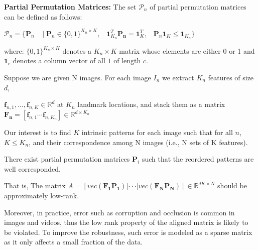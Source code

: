 \documentclass[fleqn, 11pt]{article}
\newcommand{\bs}[1]{\boldsymbol{#1}}
\begin{document}
\textbf{Partial Permutation Matrices: } The set $\mathcal{P}_n$ of partial permutation matrices can be defined as follows:

\begin{center}
    $\mathcal{P}_n  = \{ \bs{P}_n \;\;\; \mid \bs{P}_n \in \{0,1\}^{K_n \times K}, 
    \;\;\; \bs{1}^T_{K_n}\bs{P_n} =   \bs{1}^T_{K}, \;\;\;     \bs{P}_n \bs{1}_K \leq  \bs{1}_{K_n}   \} $
\end{center}
where: $ \{0,1\}^{K_n \times K}$ denotes a $K_n \times K$ matrix whose elements are either 0 or 1 
and $\bs{1}_c$ denotes a column vector of all $1$ of length $c$.

\medskip

Suppose we are given N images. For each image $I_n$ we extract $K_n$ features of size $d$, 

$\bs{f}_{n,1} , \ldots , \bs{f}_{n,K} \in \mathbb{R}^d$ at $K_n$ landmark locations, 
and stack them as a matrix $\bs{F_n} =  [ \bs{f}_{n,1}  \cdots \bs{f}_{n,K_n} ] \in  \mathbb{R}^{d \times K_n} $


Our interest is to find $K$ 
intrinsic patterns for each image such that for all $n$, $K \leq K_n$, and their
correspondence among N images (i.e., N sets of K features). 

There
exist partial permutation matrices $\bs{P}_i$ such that the reordered patterns
are well corresponded.

\smallskip

That is, 
The matrix $A = [vec(\bs{F_1 P_1} )| · · · |vec(\bs{F_N P_N} )] \in  \mathbb{R}^{dK \times N} $  should be approximately low-rank.


\medskip

Moreover, in practice, error such as corruption and occlusion is common in images and
videos, thus the low rank property of the aligned matrix is likely to be violated.
To improve the robustness, such error is modeled as a sparse matrix as it only
affects a small fraction of the data.


\smallskip
\end{document}
